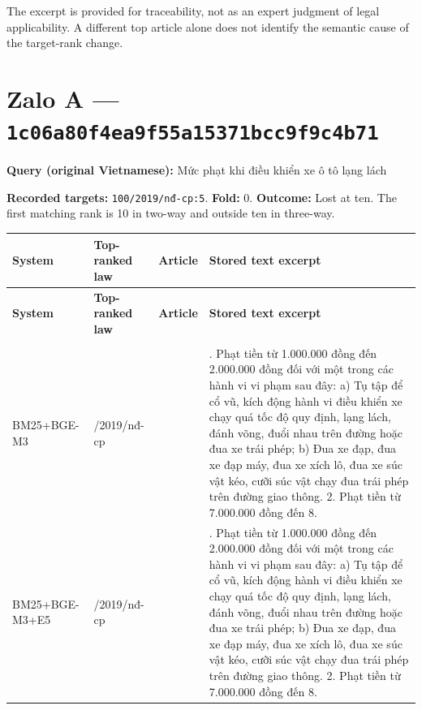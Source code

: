 The excerpt is provided for traceability, not as an expert judgment of legal applicability. A different top article alone does not identify the semantic cause of the target-rank change.

\section{Zalo A — \texttt{1c06a80f\allowbreak{}4ea9f55a\allowbreak{}15371bcc\allowbreak{}9f9c4b71}}

\textbf{Query (original Vietnamese):} Mức phạt khi điều khiển xe ô tô lạng lách

\textbf{Recorded targets:} \texttt{100/2019\allowbreak{}/nđ-cp:5}. \textbf{Fold:} 0. \textbf{Outcome:} Lost at ten. The first matching rank is 10 in two-way and outside ten in three-way.

\begingroup
\scriptsize
\setlength{\tabcolsep}{2pt}
\renewcommand{\arraystretch}{1.0}
\begin{longtable}{>{\raggedright\arraybackslash}p{2.022cm}>{\raggedright\arraybackslash}p{2.022cm}>{\raggedright\arraybackslash}p{1.891cm}>{\raggedright\arraybackslash}p{9.185cm}}
\toprule
\textbf{System} & \textbf{Top-ranked law} & \textbf{Article} & \textbf{Stored text excerpt} \\
\midrule
\endfirsthead
\toprule
\textbf{System} & \textbf{Top-ranked law} & \textbf{Article} & \textbf{Stored text excerpt} \\
\midrule
\endhead
\midrule
\multicolumn{4}{r}{\footnotesize Continued on next page}\\
\endfoot
\bottomrule
\endlastfoot
BM25+\allowbreak{}BGE-M3 & 100/\allowbreak{}2019/\allowbreak{}nđ-cp & 34 & 1. Phạt tiền từ 1.000.000 đồng đến 2.000.000 đồng đối với một trong các hành vi vi phạm sau đây: a) Tụ tập để cổ vũ, kích động hành vi điều khiển xe chạy quá tốc độ quy định, lạng lách, đánh võng, đuổi nhau trên đường hoặc đua xe trái phép; b) Đua xe đạp, đua xe đạp máy, đua xe xích lô, đua xe súc vật kéo, cưỡi súc vật chạy đua trái phép trên đường giao thông. 2. Phạt tiền từ 7.000.000 đồng đến 8. \\
BM25+\allowbreak{}BGE-M3+\allowbreak{}E5 & 100/\allowbreak{}2019/\allowbreak{}nđ-cp & 34 & 1. Phạt tiền từ 1.000.000 đồng đến 2.000.000 đồng đối với một trong các hành vi vi phạm sau đây: a) Tụ tập để cổ vũ, kích động hành vi điều khiển xe chạy quá tốc độ quy định, lạng lách, đánh võng, đuổi nhau trên đường hoặc đua xe trái phép; b) Đua xe đạp, đua xe đạp máy, đua xe xích lô, đua xe súc vật kéo, cưỡi súc vật chạy đua trái phép trên đường giao thông. 2. Phạt tiền từ 7.000.000 đồng đến 8. \\
\end{longtable}
\endgroup

